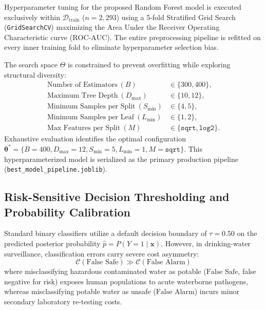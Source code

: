 \documentclass[pdflatex,sn-mathphys-num]{sn-jnl}%
\theoremstyle{thmstyleone}%
\theoremstyle{thmstyletwo}%
\theoremstyle{thmstylethree}%
\begin{document}
Hyperparameter tuning for the proposed Random Forest model is executed exclusively within $\mathcal{D}_{\text{train}}$ ($n = 2,293$) using a 5-fold Stratified Grid Search (\texttt{GridSearchCV}) maximizing the Area Under the Receiver Operating Characteristic curve ($\text{ROC-AUC}$). The entire preprocessing pipeline is refitted on every inner training fold to eliminate hyperparameter selection bias.

The search space $\Theta$ is constrained to prevent overfitting while exploring structural diversity:
\begin{align*}
    \text{Number of Estimators} \ (B) &\in \{300, 400\}, \\
    \text{Maximum Tree Depth} \ (D_{\max}) &\in \{10, 12\}, \\
    \text{Minimum Samples per Split} \ (S_{\min}) &\in \{4, 5\}, \\
    \text{Minimum Samples per Leaf} \ (L_{\min}) &\in \{1, 2\}, \\
    \text{Max Features per Split} \ (M) &\in \{\texttt{sqrt}, \texttt{log2}\}.
\end{align*}
Exhaustive evaluation identifies the optimal configuration $\boldsymbol{\theta}^* = \{B = 400, D_{\max} = 12, S_{\min} = 5, L_{\min} = 1, M = \texttt{sqrt}\}$. This hyperparameterized model is serialized as the primary production pipeline (\texttt{best\_model\_pipeline.joblib}).


\subsection{Risk-Sensitive Decision Thresholding and Probability Calibration}\label{subsec4_5}

Standard binary classifiers utilize a default decision boundary of $\tau = 0.50$ on the predicted posterior probability $\hat{p} = P(Y = 1 \mid \mathbf{x})$. However, in drinking-water surveillance, classification errors carry severe cost asymmetry:
\begin{equation}
    \mathcal{C}(\text{False Safe}) \gg \mathcal{C}(\text{False Alarm})
    \label{eq:cost_asymmetry}
\end{equation}
where misclassifying hazardous contaminated water as potable ($\text{False Safe}$, false negative for risk) exposes human populations to acute waterborne pathogens, whereas misclassifying potable water as unsafe ($\text{False Alarm}$) incurs minor secondary laboratory re-testing costs.
\end{document}
